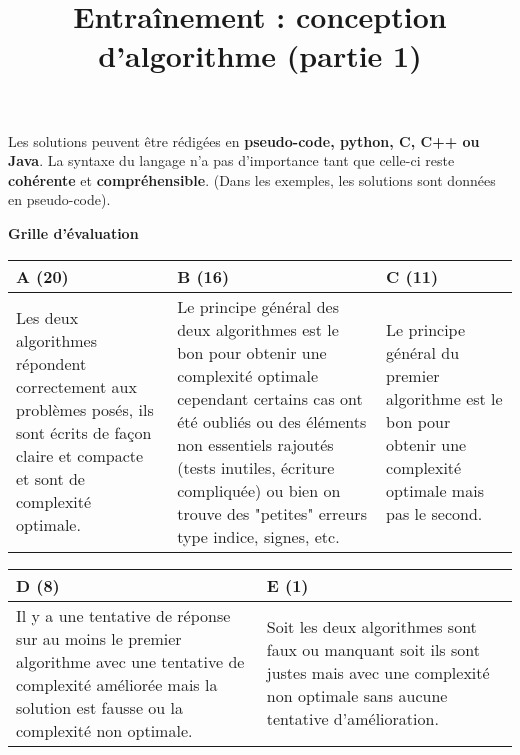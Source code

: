 \documentclass{../cours}
\title{Entraînement : conception d'algorithme (partie 1) }
\begin{document}
\maketitle

Les solutions peuvent être rédigées en \textbf{pseudo-code, python, C, C++ ou Java}. La syntaxe du langage n'a pas d'importance tant que celle-ci reste \textbf{cohérente} et \textbf{compréhensible}. (Dans les exemples, les solutions sont données en pseudo-code).

\textbf{Grille d'évaluation}

\vspace{0.5cm}

\begin{tabular}{|p{5cm}|p{5cm}|p{5cm}|}
\hline 
A (20) & B (16) & C (11) \\ \hline
\small{Les deux algorithmes répondent correctement aux problèmes posés, ils sont écrits de façon claire et compacte et sont de complexité optimale.}
&
\small{Le principe général des deux algorithmes est le bon pour obtenir une complexité optimale cependant certains cas ont été oubliés ou des éléments non essentiels rajoutés (tests inutiles, écriture compliquée) ou bien on trouve des "petites" erreurs type indice, signes, etc. }
&
\small{Le principe général du premier algorithme est le bon pour obtenir une complexité optimale mais pas le second.}

\\ \hline

\end{tabular}

\begin{tabular}{|p{5cm}|p{5cm}|}
\hline
 D (8) & E (1) \\ \hline
\small{Il y a une tentative de réponse sur au moins le premier algorithme avec une tentative de complexité améliorée mais la solution est fausse ou la complexité non optimale.}
&
\small{Soit les deux algorithmes sont faux ou manquant soit ils sont justes mais avec une complexité non optimale sans aucune tentative d'amélioration.}
\\ \hline
\end{tabular}





\end{document}
